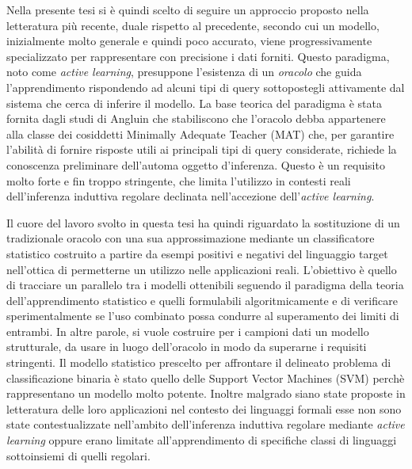 Nella presente tesi si è quindi scelto di seguire un approccio proposto nella letteratura più recente, duale rispetto al precedente, secondo cui un modello, inizialmente molto generale e quindi poco accurato, viene progressivamente specializzato per rappresentare con precisione i dati forniti. Questo paradigma, noto come \textit{active learning}, presuppone l'esistenza di un \textit{oracolo} che guida l'apprendimento rispondendo ad alcuni tipi di query sottopostegli attivamente dal sistema che cerca di inferire il modello. La base teorica del paradigma è stata fornita dagli studi di Angluin \cite{Angluin87} che stabiliscono che l'oracolo debba appartenere alla classe dei cosiddetti Minimally Adequate Teacher (MAT) che, per garantire l'abilità di fornire risposte utili ai principali tipi di query considerate, richiede la conoscenza preliminare dell'automa oggetto d'inferenza.
Questo è un requisito molto forte e fin troppo stringente, che limita l'utilizzo in contesti reali dell'inferenza induttiva regolare declinata nell'accezione dell'\textit{active learning}.
 

Il cuore del lavoro svolto in questa tesi ha quindi riguardato la sostituzione di un tradizionale oracolo con una sua approssimazione mediante un classificatore statistico costruito a partire da esempi positivi e negativi del linguaggio target nell'ottica di permetterne un utilizzo nelle applicazioni reali. L'obiettivo è quello di tracciare un parallelo tra i modelli ottenibili seguendo il paradigma della teoria dell'apprendimento statistico e quelli formulabili algoritmicamente e di verificare sperimentalmente se l'uso combinato possa condurre al superamento dei limiti di entrambi. In altre parole, si vuole costruire per i campioni dati un modello strutturale, da usare in luogo dell'oracolo in modo da superarne i requisiti stringenti.  Il modello statistico prescelto per affrontare il delineato problema di classificazione binaria è stato quello delle Support Vector Machines (SVM) perchè rappresentano un modello molto potente. Inoltre malgrado siano state proposte in letteratura delle loro applicazioni nel contesto dei linguaggi formali esse non sono state contestualizzate nell’ambito dell’inferenza induttiva regolare mediante \textit{active learning} oppure erano limitate all'apprendimento di specifiche classi di linguaggi sottoinsiemi di quelli regolari.



